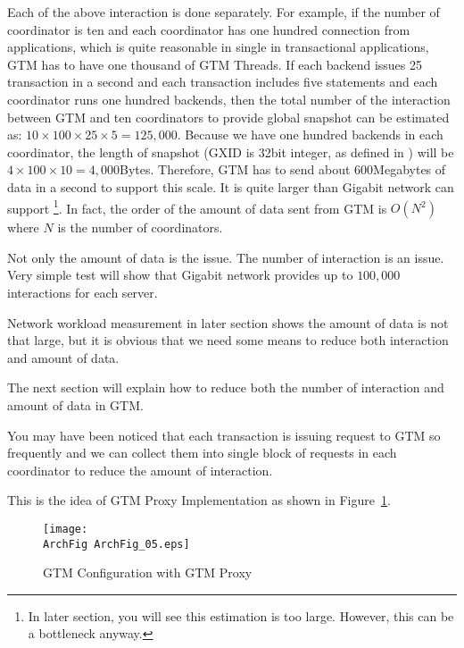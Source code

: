   Each of the above interaction is done separately.
  For example, if the number of coordinator is ten and each coordinator has
  one hundred connection from applications, which is quite reasonable in
  single \PG{} in transactional applications, GTM has to have one thousand of
  GTM Threads.
  If each backend issues 25 transaction in a second and each transaction includes
  five statements and each coordinator runs one hundred backends,
  then the total number of the interaction between GTM and
  ten coordinators to provide global snapshot can be estimated as:
  $10\times 100\times 25\times 5 = 125,000$.
  Because we have one hundred backends in each coordinator, the length of snapshot
  (GXID is 32bit integer, as defined in \PG) will be $4 \times 100 \times 10 = 4,000$Bytes.
  Therefore, GTM has to send about 600Megabytes of data in a second to support this scale.
  It is quite larger than Gigabit network can support%
  \footnote{In later section, you will see this estimation is too large. However, this can
	  be a bottleneck anyway.
  }.
  In fact, the order of the amount of data sent from GTM is $O(N^2)$ where $N$ is
  the number of coordinators.
  
  Not only the amount of data is the issue.
  The number of interaction is an issue.
  Very simple test will show that Gigabit network provides up to $100,000$ interactions for
  each server.
  
  Network workload measurement in later section shows the amount of data is
  not that large, but it is obvious that we need some means to reduce both
  interaction and amount of data.
  
  The next section will explain how to reduce both the number of interaction and
  amount of data in GTM.




  You may have been noticed that each transaction is issuing request to GTM so
  frequently and we can collect them into single block of requests in each
  coordinator to reduce the amount of interaction.
  
  This is the idea of GTM Proxy Implementation as shown in Figure~\ref{archfig:12}.
  
  \begin{figure}[htp]
	  \begin{center}
		  \texttt{[image: \\ArchFig ArchFig\_05.eps]}
		  \caption{\label{archfig:12}GTM Configuration with GTM Proxy}
	  \end{center}
  \end{figure}
  
